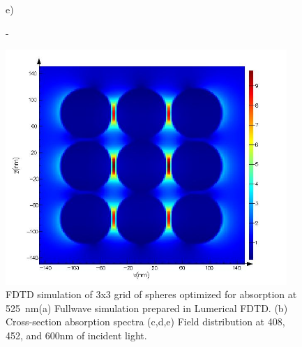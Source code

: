 \documentclass[a4paper]{article}
\begin{document}
\begin{figure}
\begin{minipage}[h]{0.49\textwidth}
  \end{minipage}
  \begin{minipage}[h]{0.49\textwidth}    \begin{flushleft}     e)    \end{flushleft}
  \end{minipage}
  \begin{minipage}[h]{0.49\textwidth}    \begin{flushleft}     -   \end{flushleft}
  \end{minipage}
  \begin{minipage}[h]{0.49\textwidth} 
    \includegraphics[width=0.95\textwidth]{fdtd-field-600nm}
  \end{minipage}
  
    \caption{ FDTD simulation of 3x3 grid of spheres optimized for
      absorption at 525~nm(a) Fullwave simulation prepared in
      Lumerical FDTD. (b) Cross-section absorption spectra (c,d,e)
      Field distribution at 408, 452, and 600nm of incident light.\label{fig:fdtd-3x3}}%
\end{figure}
\end{document}
